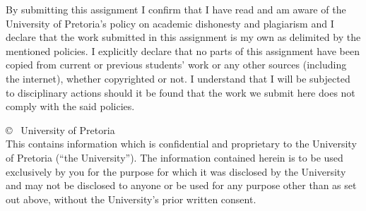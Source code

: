 \begin{titlepage}
    
    \noindent By submitting this assignment I confirm that I have read and am aware of the University of Pretoria's policy on academic dishonesty and plagiarism and I declare that the work submitted in this assignment is my own as delimited by the mentioned policies. I explicitly declare that no parts of this assignment have been copied from current or previous students' work or any other sources (including the internet), whether copyrighted or not. I understand that I will be subjected to disciplinary actions should it be found that the work we submit here does not comply with the said policies.
	
    \vfill
  
    \scriptsize%
    \noindent%
    \copyright~\number\year{} University of Pretoria \\
    This contains information which is confidential and proprietary to the University of Pretoria (``the
    University''). The information contained herein is to be used exclusively by you for the purpose for which it was disclosed by the University and may not be disclosed to anyone or be used for any purpose other than as set out above, without the University’s prior written consent.%


\end{titlepage}